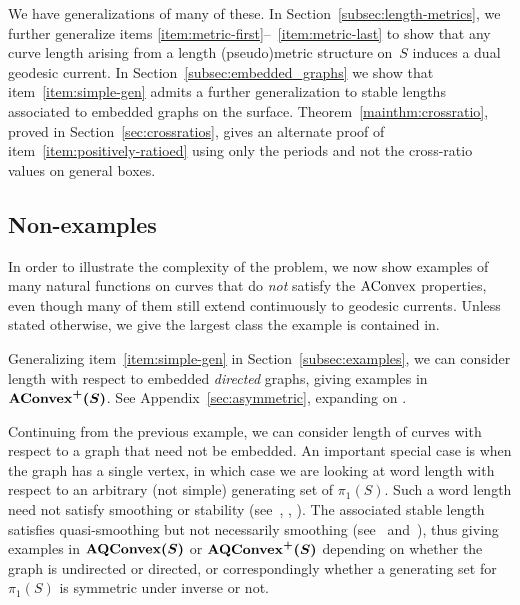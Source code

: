 We have generalizations of many of these. In
Section~\ref{subsec:length-metrics}, we further generalize items
\ref{item:metric-first}--~\ref{item:metric-last} to show that any curve length arising from a length
(pseudo)metric structure on~$S$ induces a dual geodesic current. In
Section~\ref{subsec:embedded_graphs} we show that
item~\ref{item:simple-gen} admits a further generalization to stable lengths associated
to embedded graphs on the surface.
Theorem~\ref{mainthm:crossratio},
proved in Section~\ref{sec:crossratios}, gives an alternate proof
of item~\ref{item:positively-ratioed} using only the periods and not
the cross-ratio values on general boxes.

\subsection{Non-examples}
\label{subsec:non-examples}

In order to illustrate the complexity of the problem,
we now show examples of many natural functions on curves that do
\emph{not} satisfy the $\mathrm{AConvex}$ properties, even though many of them
still extend continuously to geodesic currents. Unless stated
otherwise, we give
the largest class the example is contained in.

\begin{example}
  \label{examp:embedded-dir-graph}
  Generalizing item~\ref{item:simple-gen} in
  Section~\ref{subsec:examples}, we can consider length with
  respect to embedded \emph{directed} graphs, giving examples in
  $\bm{\mathrm{AConvex}^+(S)}$. See Appendix~\ref{sec:asymmetric}, expanding on
  \cite[Section~4.6]{MGT21:Smoothings}.
\end{example}

\begin{example}
  \label{examp:non-emb-graph}
  Continuing from the previous example, we can consider length of
  curves with respect to a graph that need not be embedded.
  An important special case is when the graph has a single vertex, in
  which case we are looking at word length with respect to an
  arbitrary (not simple) generating set of $\pi_1(S)$. Such a word length need
  not satisfy smoothing or stability
  (see~\cite[Example~4.10]{MGT21:Smoothings},
  \cite[Theorem~1.5]{EPS20:CountingCurves},
  \cite{Erlandsson:WordLength}). The associated stable length
  satisfies quasi-smoothing but
  not necessarily smoothing
  (see~\cite[Example~4.10]{MGT21:Smoothings}
  and~\cite[Theorem~B]{MGT21:Smoothings}), thus giving examples in
  $\bm{\mathrm{AQConvex}(S)}$ or $\bm{\mathrm{AQConvex}^+(S)}$ depending on
  whether the graph is
  undirected or directed, or correspondingly whether a generating
  set for $\pi_1(S)$ is symmetric
  under inverse or not.
\end{example}

